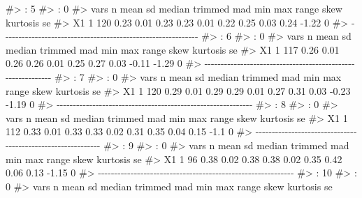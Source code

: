\documentclass[
  10pt,
  a4paper,
]{book}
\newenvironment{Shaded}{\begin{snugshade}}{\end{snugshade}}
\newcommand{\CommentTok}[1]{\textcolor[rgb]{0.37,0.37,0.37}{#1}}
\begin{document}
\begin{Shaded}
\begin{Highlighting}[]
\CommentTok{\#\textgreater{} : 5}
\CommentTok{\#\textgreater{} : 0}
\CommentTok{\#\textgreater{}    vars   n mean   sd median trimmed  mad  min  max range skew kurtosis se}
\CommentTok{\#\textgreater{} X1    1 120 0.23 0.01   0.23    0.23 0.01 0.22 0.25  0.03 0.24    {-}1.22  0}
\CommentTok{\#\textgreater{} {-}{-}{-}{-}{-}{-}{-}{-}{-}{-}{-}{-}{-}{-}{-}{-}{-}{-}{-}{-}{-}{-}{-}{-}{-}{-}{-}{-}{-}{-}{-}{-}{-}{-}{-}{-}{-}{-}{-}{-}{-}{-}{-}{-}{-}{-}{-}{-}{-}{-}{-}{-}{-}{-}{-}{-}{-}{-}{-}{-} }
\CommentTok{\#\textgreater{} : 6}
\CommentTok{\#\textgreater{} : 0}
\CommentTok{\#\textgreater{}    vars   n mean   sd median trimmed  mad  min  max range  skew kurtosis se}
\CommentTok{\#\textgreater{} X1    1 117 0.26 0.01   0.26    0.26 0.01 0.25 0.27  0.03 {-}0.11    {-}1.29  0}
\CommentTok{\#\textgreater{} {-}{-}{-}{-}{-}{-}{-}{-}{-}{-}{-}{-}{-}{-}{-}{-}{-}{-}{-}{-}{-}{-}{-}{-}{-}{-}{-}{-}{-}{-}{-}{-}{-}{-}{-}{-}{-}{-}{-}{-}{-}{-}{-}{-}{-}{-}{-}{-}{-}{-}{-}{-}{-}{-}{-}{-}{-}{-}{-}{-} }
\CommentTok{\#\textgreater{} : 7}
\CommentTok{\#\textgreater{} : 0}
\CommentTok{\#\textgreater{}    vars   n mean   sd median trimmed  mad  min  max range  skew kurtosis se}
\CommentTok{\#\textgreater{} X1    1 120 0.29 0.01   0.29    0.29 0.01 0.27 0.31  0.03 {-}0.23    {-}1.19  0}
\CommentTok{\#\textgreater{} {-}{-}{-}{-}{-}{-}{-}{-}{-}{-}{-}{-}{-}{-}{-}{-}{-}{-}{-}{-}{-}{-}{-}{-}{-}{-}{-}{-}{-}{-}{-}{-}{-}{-}{-}{-}{-}{-}{-}{-}{-}{-}{-}{-}{-}{-}{-}{-}{-}{-}{-}{-}{-}{-}{-}{-}{-}{-}{-}{-} }
\CommentTok{\#\textgreater{} : 8}
\CommentTok{\#\textgreater{} : 0}
\CommentTok{\#\textgreater{}    vars   n mean   sd median trimmed  mad  min  max range skew kurtosis se}
\CommentTok{\#\textgreater{} X1    1 112 0.33 0.01   0.33    0.33 0.02 0.31 0.35  0.04 0.15     {-}1.1  0}
\CommentTok{\#\textgreater{} {-}{-}{-}{-}{-}{-}{-}{-}{-}{-}{-}{-}{-}{-}{-}{-}{-}{-}{-}{-}{-}{-}{-}{-}{-}{-}{-}{-}{-}{-}{-}{-}{-}{-}{-}{-}{-}{-}{-}{-}{-}{-}{-}{-}{-}{-}{-}{-}{-}{-}{-}{-}{-}{-}{-}{-}{-}{-}{-}{-} }
\CommentTok{\#\textgreater{} : 9}
\CommentTok{\#\textgreater{} : 0}
\CommentTok{\#\textgreater{}    vars  n mean   sd median trimmed  mad  min  max range skew kurtosis se}
\CommentTok{\#\textgreater{} X1    1 96 0.38 0.02   0.38    0.38 0.02 0.35 0.42  0.06 0.13    {-}1.15  0}
\CommentTok{\#\textgreater{} {-}{-}{-}{-}{-}{-}{-}{-}{-}{-}{-}{-}{-}{-}{-}{-}{-}{-}{-}{-}{-}{-}{-}{-}{-}{-}{-}{-}{-}{-}{-}{-}{-}{-}{-}{-}{-}{-}{-}{-}{-}{-}{-}{-}{-}{-}{-}{-}{-}{-}{-}{-}{-}{-}{-}{-}{-}{-}{-}{-} }
\CommentTok{\#\textgreater{} : 10}
\CommentTok{\#\textgreater{} : 0}
\CommentTok{\#\textgreater{}    vars  n mean   sd median trimmed  mad  min  max range skew kurtosis   se}

\end{Highlighting}
\end{Shaded}
\end{document}
